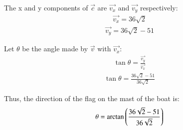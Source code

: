 \documentclass[journal]{IEEEtran}
\begin{document}
\begin{enumerate}
The x and y components of $\vec{c}$ are $\vec{v_x}$ and $\vec{v_y}$ respectively:
\begin{align}
    \vec{v_x} = 36\sqrt{2}
\end{align}
\begin{align}
    \vec{v_y} = 36\sqrt{2}-51
\end{align}

Let $\theta$ be the angle made by $\vec{v}$ with $\vec{v_x}$:
\begin{align}
    \tan \theta = \frac{\vec{v_y}}{\vec{v_x}}
\end{align}
\begin{align}
    \tan \theta = \frac{36\sqrt{2}-51}{36\sqrt{2}}
\end{align}

Thus, the direction of the flag on the mast of the boat is:
\begin{align}
    \theta = \arctan\left(\frac{36\sqrt{2}-51}{36\sqrt{2}}\right)
\end{align}
\end{enumerate}
\end{document}
